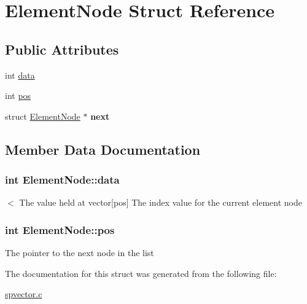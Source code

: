 \hypertarget{struct_element_node}{\section{Element\-Node Struct Reference}
\label{struct_element_node}
}
\subsection*{Public Attributes}
\begin{DoxyCompactItemize}
\item 
int \hyperlink{struct_element_node_abd64425834fb036c8184ed070bac5967}{data}
\item 
int \hyperlink{struct_element_node_a1311927d2c5406ce009c7fc210e82266}{pos}
\item 
\hypertarget{struct_element_node_a4866d782f3bc2710bd0a136081f9f99f}{struct \hyperlink{struct_element_node}{Element\-Node} $\ast$ {\bfseries next}}\label{struct_element_node_a4866d782f3bc2710bd0a136081f9f99f}

\end{DoxyCompactItemize}


\subsection{Member Data Documentation}
\hypertarget{struct_element_node_abd64425834fb036c8184ed070bac5967}{
\subsubsection[{data}]{\setlength{\rightskip}{0pt plus 5cm}int Element\-Node\-::data}}\label{struct_element_node_abd64425834fb036c8184ed070bac5967}
$<$ The value held at vector\mbox{[}pos\mbox{]} The index value for the current element node \hypertarget{struct_element_node_a1311927d2c5406ce009c7fc210e82266}{
\subsubsection[{pos}]{\setlength{\rightskip}{0pt plus 5cm}int Element\-Node\-::pos}}\label{struct_element_node_a1311927d2c5406ce009c7fc210e82266}
The pointer to the next node in the list 

The documentation for this struct was generated from the following file\-:\begin{DoxyCompactItemize}
\item 
\hyperlink{spvector_8c}{spvector.\-c}\end{DoxyCompactItemize}
